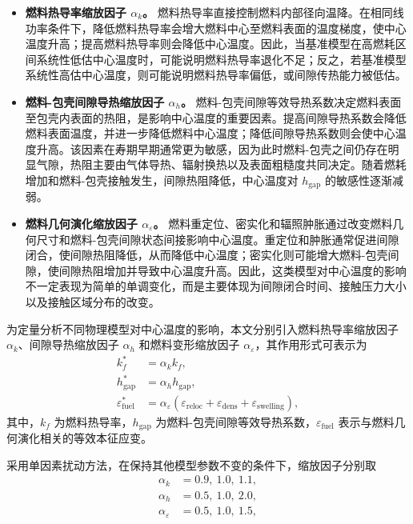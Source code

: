 \begin{itemize}
	\item \textbf{燃料热导率缩放因子 \(\alpha_k\)。}
	燃料热导率直接控制燃料内部径向温降。在相同线功率条件下，降低燃料热导率会增大燃料中心至燃料表面的温度梯度，使中心温度升高；提高燃料热导率则会降低中心温度。因此，当基准模型在高燃耗区间系统性低估中心温度时，可能说明燃料热导率退化不足；反之，若基准模型系统性高估中心温度，则可能说明燃料热导率偏低，或间隙传热能力被低估。
	
	\item \textbf{燃料-包壳间隙导热缩放因子 \(\alpha_h\)。}
	燃料-包壳间隙等效导热系数决定燃料表面至包壳内表面的热阻，是影响中心温度的重要因素。提高间隙导热系数会降低燃料表面温度，并进一步降低燃料中心温度；降低间隙导热系数则会使中心温度升高。该因素在寿期早期通常更为敏感，因为此时燃料-包壳之间仍存在明显气隙，热阻主要由气体导热、辐射换热以及表面粗糙度共同决定。随着燃耗增加和燃料-包壳接触发生，间隙热阻降低，中心温度对 \(h_\mathrm{gap}\) 的敏感性逐渐减弱。
	
	\item \textbf{燃料几何演化缩放因子 \(\alpha_\varepsilon\)。}
	燃料重定位、密实化和辐照肿胀通过改变燃料几何尺寸和燃料-包壳间隙状态间接影响中心温度。重定位和肿胀通常促进间隙闭合，使间隙热阻降低，从而降低中心温度；密实化则可能增大燃料-包壳间隙，使间隙热阻增加并导致中心温度升高。因此，这类模型对中心温度的影响不一定表现为简单的单调变化，而是主要体现为间隙闭合时间、接触压力大小以及接触区域分布的改变。
\end{itemize}

为定量分析不同物理模型对中心温度的影响，本文分别引入燃料热导率缩放因子 \(\alpha_k\)、间隙导热缩放因子 \(\alpha_h\) 和燃料变形缩放因子 \(\alpha_\varepsilon\)，其作用形式可表示为
\begin{align}
	k_f^\ast &= \alpha_k k_f, \nonumber \\
	h_\mathrm{gap}^\ast &= \alpha_h h_\mathrm{gap}, \nonumber \\
	\varepsilon^\ast_\mathrm{fuel}
	&=
	\alpha_\varepsilon
	\left(
	\varepsilon_\mathrm{reloc}
	+
	\varepsilon_\mathrm{dens}
	+
	\varepsilon_\mathrm{swelling}
	\right), \label{eq:fuel_params}
\end{align}
其中，\(k_f\) 为燃料热导率，\(h_\mathrm{gap}\) 为燃料-包壳间隙等效导热系数，\(\varepsilon_\mathrm{fuel}\) 表示与燃料几何演化相关的等效本征应变。

采用单因素扰动方法，在保持其他模型参数不变的条件下，缩放因子分别取
\begin{align}
	\alpha_k &= 0.9,\ 1.0,\ 1.1, \nonumber \\
	\alpha_h &= 0.5,\ 1.0,\ 2.0, \nonumber \\
	\alpha_\varepsilon &= 0.5,\ 1.0,\ 1.5, \label{eq:alpha_params}
\end{align}

